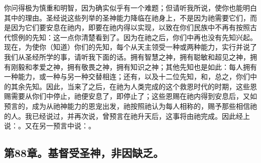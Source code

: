  你问得极为慎重和明智，因为确实似乎有一个难题；但请听我所说，使你也能明白其中的理由。圣经说这些列举的圣神能力降临在祂身上，不是因为祂需要它们，而是因为它们要安息在祂内，即要在祂内得以实现，以致在你们民族中不再有按照古代惯例的先知：这一点你清楚看到了。因为在祂之后，你们中再也没有先知兴起。现在，为使你（知道）你们的先知，每个从天主领受一种或两种能力，实行并说了我们从圣经所学的事，请听我下面的话。拥有智慧之神，拥有聪敏和超见之神，拥有刚毅和孝爱之神，拥有敬畏之神，拥有知识之神；其他先知也是如此：每人拥有一种能力，或一种与另一种交替相连；还有，以及十二位先知，和，总之，你们中的其余先知。因此，当来了之后，在祂为人类完成的这个救恩时代的时期，这些恩赐需要从你们中停止，祂便安息了，即停止了；这些恩赐在祂内得到安息后，又如预言的，成为从祂神能力的恩宠出发，祂按照祂认为每人相称的，赐予那些相信祂的人。我已经说过，并再次说，曾预言在祂升天后，这事将由祂完成。因此经上说：。又在另一预言中说：。\par


\subsection{第88章。基督受圣神，非因缺乏。}

